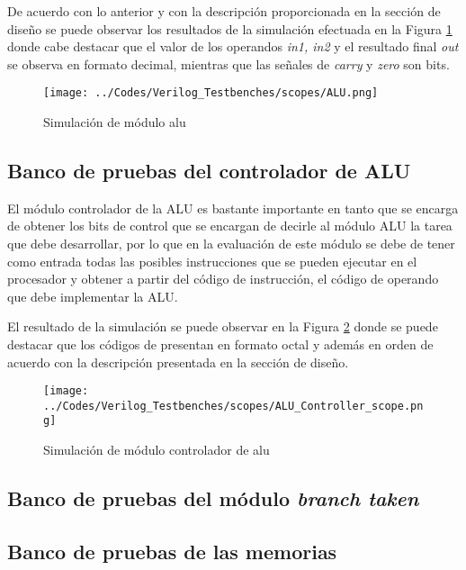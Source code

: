 De acuerdo con lo anterior y con la descripci\' on proporcionada en la secci\' on de dise\~ no se puede observar los resultados de la simulaci\' on efectuada en la Figura \ref{fig:alu} donde cabe destacar que el valor de los operandos \textit{in1, in2} y el resultado final \textit{out} se observa en formato decimal, mientras que las se\~ nales de \textit{carry} y \textit{zero} son bits.


\begin{figure}[hbtp]
\caption{Simulaci\' on de m\' odulo alu}
\centering
\texttt{[image: ../Codes/Verilog\_Testbenches/scopes/ALU.png]}
\label{fig:alu}
\end{figure}

\subsection{Banco de pruebas del controlador de ALU}
El m\' odulo controlador de la ALU es bastante importante en tanto que se encarga de obtener los bits de control que se encargan de decirle al m\' odulo ALU la tarea que debe desarrollar, por lo que en la evaluaci\' on de este m\' odulo se debe de tener como entrada todas las posibles instrucciones que se pueden ejecutar en el procesador y obtener a partir del c\' odigo de instrucci\' on, el c\' odigo de operando que debe implementar la ALU.

El resultado de la simulaci\' on se puede observar en la Figura \ref{fig:aluControl} donde se puede destacar que los c\' odigos de presentan en formato octal y adem\' as en orden de acuerdo con la descripci\' on presentada en la secci\' on de dise\~ no.

\begin{figure}[hbtp]
\caption{Simulaci\' on de m\' odulo controlador de alu}
\centering
\texttt{[image: ../Codes/Verilog\_Testbenches/scopes/ALU\_Controller\_scope.png]}
\label{fig:aluControl}
\end{figure}


\subsection{Banco de pruebas del m\' odulo \textit{branch taken}}

\subsection{Banco de pruebas de las memorias}




